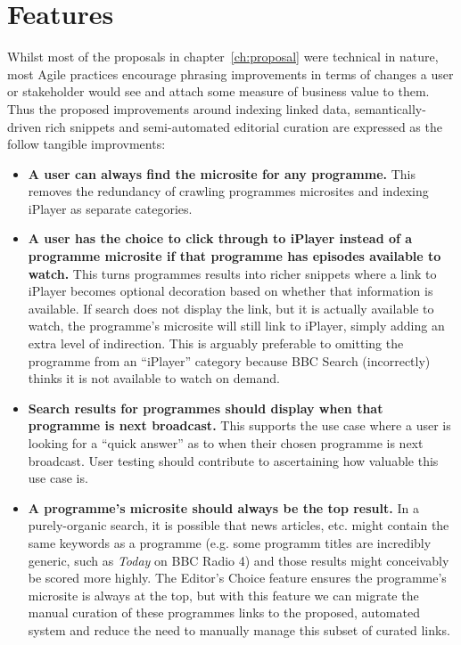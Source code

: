 \section{Features}

Whilst most of the proposals in chapter~\ref{ch:proposal} were
technical in nature, most Agile practices encourage phrasing
improvements in terms of changes a user or stakeholder would see
and attach some measure of business value to them. Thus the proposed
improvements around indexing linked data, semantically-driven rich
snippets and semi-automated editorial curation are expressed as
the follow tangible improvments:

\begin{itemize}

\item \textbf{A user can always find the microsite for any programme.}
  This removes the redundancy
  of crawling programmes microsites and indexing iPlayer as separate categories.

\item \textbf{A user has the choice to click through to iPlayer instead of a programme microsite if that programme has episodes available to watch.}
  This turns programmes results into richer
  snippets where a link to iPlayer becomes optional decoration based on whether that information
  is available. If search does not display the link, but it is actually available to watch, the
  programme's microsite will still link to iPlayer, simply adding an extra level of indirection. This
  is arguably preferable to omitting the programme from an ``iPlayer'' category because BBC Search
  (incorrectly) thinks it is not available to watch on demand.

\item \textbf{Search results for programmes should display when that programme is next broadcast.}
  This supports the use case where a user is looking for a ``quick answer'' as to when
  their chosen programme is next broadcast. User testing should contribute to ascertaining how valuable
  this use case is.

\item \textbf{A programme's microsite should always be the top result.}
  In a purely-organic search, it
  is possible that news articles, etc. might contain the same keywords as a programme (e.g. some programm
  titles are incredibly generic, such as \emph{Today} on BBC Radio 4) and those results might conceivably
  be scored more highly. The Editor's Choice feature ensures the programme's microsite is always at
  the top, but with this feature we can migrate the manual curation of these programmes links to
  the proposed, automated system and reduce the need to manually manage this subset of curated links.


\end{itemize}
